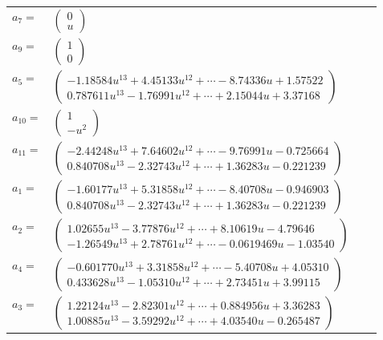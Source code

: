 \documentclass[1p]{elsarticle_modified}
\theoremstyle{definition}
\begin{document}
\begin{tabular}{m{7pt} m{180pt} m{7pt} m{180pt} }
\flushright $a_{7}=$&$\begin{pmatrix}0\\u\end{pmatrix}$ \\
\flushright $a_{9}=$&$\begin{pmatrix}1\\0\end{pmatrix}$ \\
\flushright $a_{5}=$&$\begin{pmatrix}-1.18584 u^{13}+4.45133 u^{12}+\cdots-8.74336 u+1.57522\\0.787611 u^{13}-1.76991 u^{12}+\cdots+2.15044 u+3.37168\end{pmatrix}$ \\
\flushright $a_{10}=$&$\begin{pmatrix}1\\- u^2\end{pmatrix}$ \\
\flushright $a_{11}=$&$\begin{pmatrix}-2.44248 u^{13}+7.64602 u^{12}+\cdots-9.76991 u-0.725664\\0.840708 u^{13}-2.32743 u^{12}+\cdots+1.36283 u-0.221239\end{pmatrix}$ \\
\flushright $a_{1}=$&$\begin{pmatrix}-1.60177 u^{13}+5.31858 u^{12}+\cdots-8.40708 u-0.946903\\0.840708 u^{13}-2.32743 u^{12}+\cdots+1.36283 u-0.221239\end{pmatrix}$ \\
\flushright $a_{2}=$&$\begin{pmatrix}1.02655 u^{13}-3.77876 u^{12}+\cdots+8.10619 u-4.79646\\-1.26549 u^{13}+2.78761 u^{12}+\cdots-0.0619469 u-1.03540\end{pmatrix}$ \\
\flushright $a_{4}=$&$\begin{pmatrix}-0.601770 u^{13}+3.31858 u^{12}+\cdots-5.40708 u+4.05310\\0.433628 u^{13}-1.05310 u^{12}+\cdots+2.73451 u+3.99115\end{pmatrix}$ \\
\flushright $a_{3}=$&$\begin{pmatrix}1.22124 u^{13}-2.82301 u^{12}+\cdots+0.884956 u+3.36283\\1.00885 u^{13}-3.59292 u^{12}+\cdots+4.03540 u-0.265487\end{pmatrix}$ \\

\end{tabular}
\end{document}
